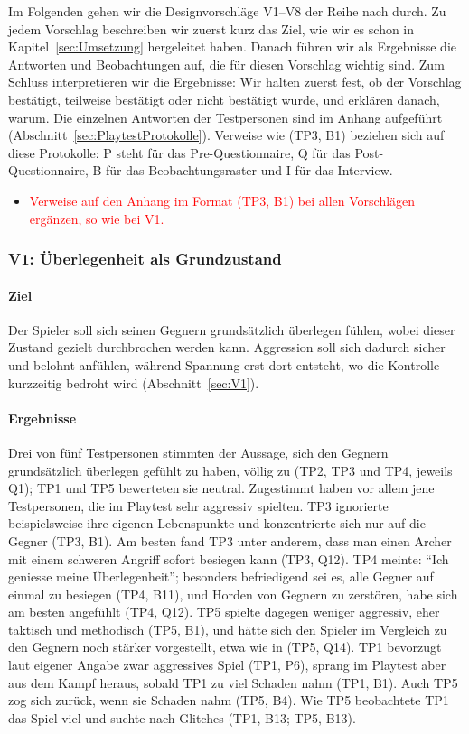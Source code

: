 \documentclass[../Main.tex]{subfiles}
\begin{document}
Im Folgenden gehen wir die Designvorschläge V1--V8 der Reihe nach durch. Zu jedem Vorschlag beschreiben wir zuerst kurz das Ziel, wie wir es schon in Kapitel~\ref{sec:Umsetzung} hergeleitet haben. Danach führen wir als Ergebnisse die Antworten und Beobachtungen auf, die für diesen Vorschlag wichtig sind. Zum Schluss interpretieren wir die Ergebnisse: Wir halten zuerst fest, ob der Vorschlag bestätigt, teilweise bestätigt oder nicht bestätigt wurde, und erklären danach, warum. Die einzelnen Antworten der Testpersonen sind im Anhang aufgeführt (Abschnitt~\ref{sec:PlaytestProtokolle}). Verweise wie (TP3, B1) beziehen sich auf diese Protokolle: P steht für das Pre-Questionnaire, Q für das Post-Questionnaire, B für das Beobachtungsraster und I für das Interview.

\begin{itemize}[leftmargin=1.5cm]
    \item \textcolor{red}{Verweise auf den Anhang im Format (TP3, B1) bei allen Vorschlägen ergänzen, so wie bei V1.}
\end{itemize}

\subsubsection{V1: Überlegenheit als Grundzustand}

\paragraph{Ziel}
Der Spieler soll sich seinen Gegnern grundsätzlich überlegen fühlen, wobei dieser Zustand gezielt durchbrochen werden kann. Aggression soll sich dadurch sicher und belohnt anfühlen, während Spannung erst dort entsteht, wo die Kontrolle kurzzeitig bedroht wird (Abschnitt~\ref{sec:V1}).

\paragraph{Ergebnisse}
Drei von fünf Testpersonen stimmten der Aussage, sich den Gegnern grundsätzlich überlegen gefühlt zu haben, völlig zu (TP2, TP3 und TP4, jeweils Q1); TP1 und TP5 bewerteten sie neutral. Zugestimmt haben vor allem jene Testpersonen, die im Playtest sehr aggressiv spielten. TP3 ignorierte beispielsweise ihre eigenen Lebenspunkte und konzentrierte sich nur auf die Gegner (TP3, B1). Am besten fand TP3 unter anderem, dass man einen Archer mit einem schweren Angriff sofort besiegen kann (TP3, Q12). TP4 meinte: \enquote{Ich geniesse meine Überlegenheit}; besonders befriedigend sei es, alle Gegner auf einmal zu besiegen (TP4, B11), und Horden von Gegnern zu zerstören, habe sich am besten angefühlt (TP4, Q12). TP5 spielte dagegen weniger aggressiv, eher taktisch und methodisch (TP5, B1), und hätte sich den Spieler im Vergleich zu den Gegnern noch stärker vorgestellt, etwa wie in  (TP5, Q14). TP1 bevorzugt laut eigener Angabe zwar aggressives Spiel (TP1, P6), sprang im Playtest aber aus dem Kampf heraus, sobald TP1 zu viel Schaden nahm (TP1, B1). Auch TP5 zog sich zurück, wenn sie Schaden nahm (TP5, B4). Wie TP5 beobachtete TP1 das Spiel viel und suchte nach Glitches (TP1, B13; TP5, B13).
\end{document}
